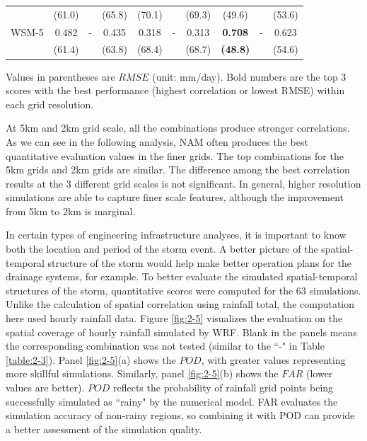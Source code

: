 \begin{table}[htbp]
\begin{threeparttable}
\begin{tabular}{cccccccccc}
		& (61.0) & & (65.8) & (70.1) & & (69.3) & (49.6) & & (53.6)\\
		WSM-5 & 0.482 & - & 0.435 & 0.318 & - & 0.313 & \textbf{0.708} & - & 0.623\\
		& (61.4) & & (63.8) & (68.4) & & (68.7) & \textbf{(48.8)} & & (54.6)\\
		\hline
		\end{tabular}
		\begin{tablenotes}
			\small
			\item Values in parentheses are $RMSE$ (unit: mm/day). Bold numbers are the top 3 scores with the best performance (highest correlation or lowest RMSE) within each grid resolution.
		\end{tablenotes}
	\end{threeparttable}
	\label{table:2-4}
\end{table}

At 5km and 2km grid scale, all the combinations produce stronger correlations. As we can see in the following analysis, NAM often produces the best quantitative evaluation values in the finer grids. The top combinations for the 5km grids and 2km grids are similar. The difference among the best correlation results at the 3 different grid scales is not significant. In general, higher resolution simulations are able to capture finer scale features, although the improvement from 5km to 2km is marginal.

In certain types of engineering infrastructure analyses, it is important to know both the location and period of the storm event. A better picture of the spatial-temporal structure of the storm would help make better operation plans for the drainage systems, for example. To better evaluate the simulated spatial-temporal structures of the storm, quantitative scores were computed for the 63 simulations. Unlike the calculation of spatial correlation using rainfall total, the computation here used hourly rainfall data. Figure \ref{fig:2-5} visualizes the evaluation on the spatial coverage of hourly rainfall simulated by WRF. Blank in the panels means the corresponding combination was not tested (similar to the ``-" in Table \ref{table:2-3}). Panel \ref{fig:2-5}(a) shows the $POD$, with greater values representing more skillful simulations. Similarly, panel \ref{fig:2-5}(b) shows the $FAR$ (lower values are better). $POD$ reflects the probability of rainfall grid points being successfully simulated as ``rainy" by the numerical model. FAR evaluates the simulation accuracy of non-rainy regions, so combining it with POD can provide a better assessment of the simulation quality.

